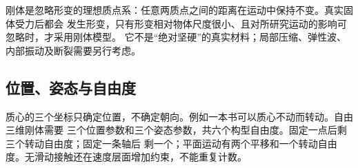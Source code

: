 {\newcommand{\bounceSpinProblemDiagram}{%
\begin{center}\begin{minipage}{\linewidth}\centering\begin{tikzpicture}[>=Latex,font=\small]
 \draw[thick](-1.7,0)--(1.7,0);\coordinate(Ca)at(0,1.7);\draw[curve](Ca)circle(.8);
 \draw[vector](Ca)--++(0,-1.1)node[right=3pt]{$v_0$};
 \draw[->,DeepBlue]($(Ca)+(20:1.02)$)arc[start angle=20,end angle=150,radius=1.02];
 \node[above]at(0,2.8){$\omega_0$};\node[right]at(1.2,1.7){$m,R$};
\end{tikzpicture}\figcap{篮球落地前的平动与自旋方向}\label{ch09:fig:bounce}\end{minipage}\end{center}}

\newcommand{\supportedRodProblemDiagram}{%
\begin{center}\begin{minipage}{\linewidth}\centering\begin{tikzpicture}[>=Latex,font=\small]
 \draw[curve](0,1)--(6,1);\foreach\x in{0,6}{\draw[thick](\x-.3,.45)--(\x,1)--(\x+.3,.45)--cycle;}
 \node[below]at(0,.4){$A$};\node[below]at(6,.4){$B$};\node[above]at(3,1.08){均匀杆，质量 $m$};
 \draw[<->](0,-.45)--(6,-.45)node[midway,below]{$L$};
\end{tikzpicture}\figcap{均匀杆由两端支点水平支撑}\label{ch09:fig:rod}\end{minipage}\end{center}}


刚体是忽略形变的理想质点系：任意两质点之间的距离在运动中保持不变。真实固体受力后都会
发生形变，只有形变相对物体尺度很小、且对所研究运动的影响可忽略时，才采用刚体模型。
它不是“绝对坚硬”的真实材料；局部压缩、弹性波、内部振动及断裂需要另行考虑。

\subsection{位置、姿态与自由度}
质心的三个坐标只确定位置，不确定朝向。例如一本书可以质心不动而转动。自由三维刚体需要
三个位置参数和三个姿态参数，共六个构型自由度。固定一点后剩三个转动自由度；固定一条轴后
剩一个；平面运动有两个平移和一个转动自由度。无滑动接触还在速度层面增加约束，不能重复计数。

}
